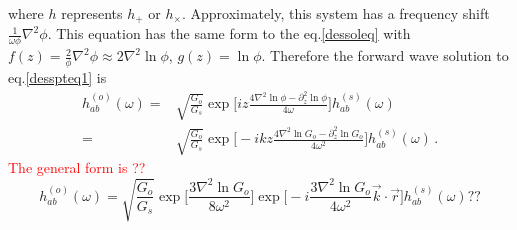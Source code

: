 \documentclass[
 jor,
 amsmath,amssymb,preprint,
]{revtex4-2}
\begin{document}
where $h$ represents $h_+$ or $h_\times$. Approximately, this system has a frequency shift $\frac{1}{\omega\phi}\nabla^2\phi$. This equation has the same form to the eq.\eqref{dessoleq} with $f(z) = \frac{2}{\phi}\nabla^2 \phi \approx 2\nabla^2\ln \phi$, $g(z) = \ln\phi$. Therefore the forward wave solution to eq.\eqref{desspteq1} is
\begin{equation}
\begin{aligned}
h^{(o)}_{ab}(\omega) = & \sqrt{\frac{G_o}{G_s}} \exp\bigg[iz \frac{ 4\nabla^2\ln \phi -\partial_z^2 \ln\phi}{4\omega} \bigg] h_{ab}^{(s)}(\omega) \\
= & \sqrt{\frac{G_o}{G_s}} \exp\bigg[-ikz \frac{ 4\nabla^2\ln G_o -\partial_z^2 \ln G_o}{4\omega^2} \bigg] h_{ab}^{(s)}(\omega) \,.
\label{ehsptsol}
\end{aligned}
\end{equation}
\textcolor{red}{The general form is ??}
\begin{equation}
h^{(o)}_{ab}(\omega) = \sqrt{\frac{G_o}{G_s}} \exp\bigg[ \frac{3\nabla^2 \ln G_o}{8\omega^2}\bigg] \exp\bigg[-i\frac{ 3\nabla^2 \ln G_o}{4\omega^2} \vec{k}\cdot\vec{r} \bigg] h_{ab}^{(s)}(\omega) ??
\end{equation}
\end{document}
